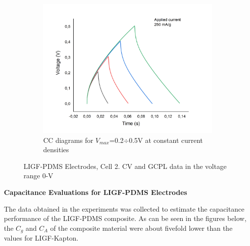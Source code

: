 \begin{figure}[H]
\begin{subfigure}{0.49\textwidth}
\includegraphics[width=1\textwidth]{Figures/Results/Electrochemistry/LIGF-PDMS-NaNO3-Swagelok/Cell2/GCPL_diff_V_cell2.jpg}
\captionsetup{width=0.9\linewidth}
\caption{CC diagrams for $V_{max}$=0.2$\div$0.5\:V at constant current densities}
\label{fig:LIGF-PDMS-cell2-CC06}
\end{subfigure}
\medskip
\caption{LIGF-PDMS Electrodes, Cell 2. CV and GCPL data in the voltage range 0\:-\:V}
\label{fig:LIGF-PDMS-cell2-06}
\end{figure}

\textbf{Capacitance Evaluations for LIGF-PDMS Electrodes}

The data obtained in the experiments was collected to estimate the capacitance performance of the LIGF-PDMS composite. As can be seen in the figures below, the $C_g$ and $C_A$ of the composite material were about fivefold lower than the values for LIGF-Kapton. 

